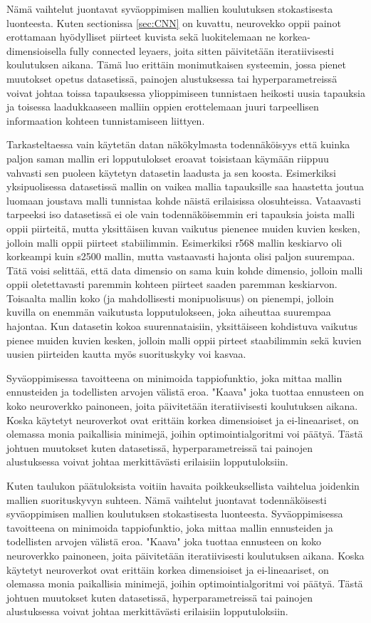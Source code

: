 Nämä vaihtelut juontavat syväoppimisen mallien koulutuksen stokastisesta luonteesta. Kuten sectionissa \ref{sec:CNN} on kuvattu, neurovekko oppii painot erottamaan hyödylliset piirteet kuvista sekä luokitelemaan ne korkea-dimensioisella fully connected leyaers, joita sitten päivitetään iteratiivisesti koulutuksen aikana.  Tämä luo erittäin monimutkaisen systeemin, jossa pienet muutokset opetus datasetissä, painojen alustuksessa tai hyperparametreissä voivat johtaa toissa tapauksessa ylioppimiseen tunnistaen heikosti uusia tapauksia ja toisessa laadukkaaseen malliin oppien erottelemaan juuri tarpeellisen informaation kohteen tunnistamiseen liittyen.

Tarkasteltaessa vain käytetän datan näkökylmasta todennäköisyys että kuinka paljon saman mallin eri lopputulokset eroavat toisistaan käymään riippuu vahvasti sen puoleen käytetyn datasetin laadusta ja sen koosta. Esimerkiksi 
yksipuolisessa datasetissä mallin on vaikea mallia tapauksille saa haastetta joutua luomaan joustava malli tunnistaa kohde näistä erilaisissa olosuhteissa. Vataavasti tarpeeksi iso datasetissä ei ole vain todennäköisemmin eri tapauksia joista  malli oppii piirteitä, mutta yksittäisen kuvan vaikutus pienenee muiden kuvien kesken, jolloin malli oppii piirteet stabiilimmin.
Esimerkiksi r568 mallin keskiarvo oli korkeampi kuin s2500 mallin, mutta vastaavasti hajonta olisi paljon suurempaa. Tätä voisi selittää, että data dimensio on sama kuin kohde dimensio, jolloin malli oppii oletettavasti paremmin kohteen piirteet saaden paremman keskiarvon. Toisaalta mallin koko (ja mahdollisesti monipuolisuus) on pienempi, jolloin kuvilla on enemmän vaikutusta lopputulokseen, joka aiheuttaa suurempaa hajontaa. Kun datasetin kokoa suurennataisiin, yksittäiseen kohdistuva vaikutus pienee muiden kuvien kesken, jolloin malli oppii pirteet staabilimmin sekä kuvien uusien piirteiden kautta myös suorituskyky voi kasvaa.  


Syväoppimisessa tavoitteena on minimoida tappiofunktio, joka mittaa mallin ennusteiden ja todellisten arvojen välistä eroa. "Kaava" joka tuottaa ennusteen on koko neuroverkko painoneen, joita päivitetään iteratiivisesti koulutuksen aikana. Koska käytetyt neuroverkot ovat erittäin korkea dimensioiset ja ei-lineaariset, on olemassa monia paikallisia minimejä, joihin optimointialgoritmi voi päätyä. Tästä johtuen muutokset kuten datasetissä, hyperparametreissä tai painojen alustuksessa voivat johtaa merkittävästi erilaisiin lopputuloksiin.

Kuten taulukon päätuloksista voitiin havaita poikkeuksellista vaihtelua joidenkin mallien suorituskyvyn suhteen. Nämä vaihtelut juontavat todennäköisesti syväoppimisen mallien koulutuksen stokastisesta luonteesta. Syväoppimisessa tavoitteena on minimoida tappiofunktio, joka mittaa mallin ennusteiden ja todellisten arvojen välistä eroa. "Kaava" joka tuottaa ennusteen on koko neuroverkko painoneen, joita päivitetään iteratiivisesti koulutuksen aikana. Koska käytetyt neuroverkot ovat erittäin korkea dimensioiset ja ei-lineaariset, on olemassa monia paikallisia minimejä, joihin optimointialgoritmi voi päätyä. Tästä johtuen muutokset kuten datasetissä, hyperparametreissä tai painojen alustuksessa voivat johtaa merkittävästi erilaisiin lopputuloksiin.


